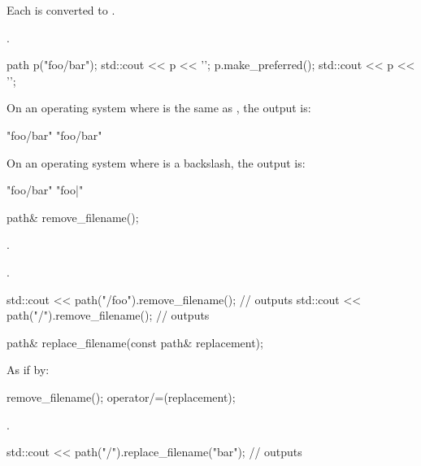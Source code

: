 \begin{itemdescr}
\pnum
\effects Each 
  is converted to .

\pnum
\returns {}.

\pnum
\enterexample
\begin{codeblock}
path p("foo/bar");
std::cout << p << '\n';
p.make_preferred();
std::cout << p << '\n';
\end{codeblock}
On an operating system where  is the same as
, the output is:
\begin{codeblock}
"foo/bar"
"foo/bar"
\end{codeblock}
On an operating system where  is a backslash, the
output is:
\begin{codeblock}
"foo/bar"
"foo\bar"
\end{codeblock}
\exitexample
\end{itemdescr}

\begin{itemdecl}
path& remove_filename();
\end{itemdecl}

\begin{itemdescr}
\pnum
\postcondition {}.

\pnum
\returns {}.

\pnum
\enterexample
\begin{codeblock}
std::cout << path("/foo").remove_filename();  // outputs 
std::cout << path("/").remove_filename();     // outputs 
\end{codeblock}
\exitexample
\end{itemdescr}

\begin{itemdecl}
path& replace_filename(const path& replacement);
\end{itemdecl}

\begin{itemdescr}
\pnum
\effects
As if by:
\begin{codeblock}
remove_filename();
operator/=(replacement);
\end{codeblock}

\pnum
\returns {}.

\pnum
\enterexample
\begin{codeblock}
std::cout << path("/").replace_filename("bar");     // outputs 
\end{codeblock}
\exitexample
\end{itemdescr}

